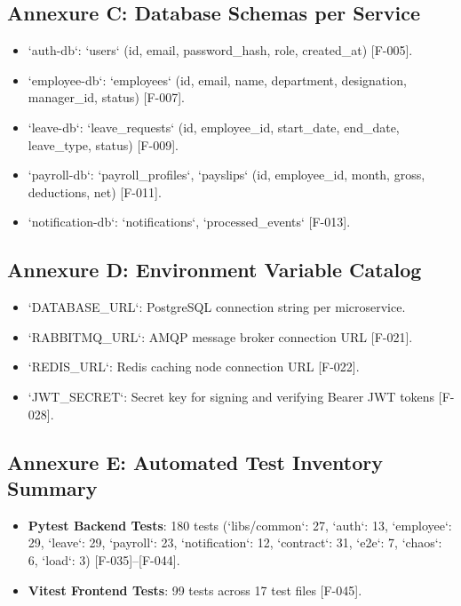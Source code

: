 \documentclass[11pt,a4paper]{article}
\begin{document}
\subsection{Annexure C: Database Schemas per Service}
\begin{itemize}
    \item `auth-db`: `users` (id, email, password\_hash, role, created\_at) [F-005].
    \item `employee-db`: `employees` (id, email, name, department, designation, manager\_id, status) [F-007].
    \item `leave-db`: `leave\_requests` (id, employee\_id, start\_date, end\_date, leave\_type, status) [F-009].
    \item `payroll-db`: `payroll\_profiles`, `payslips` (id, employee\_id, month, gross, deductions, net) [F-011].
    \item `notification-db`: `notifications`, `processed\_events` [F-013].
\end{itemize}

\subsection{Annexure D: Environment Variable Catalog}
\begin{itemize}
    \item `DATABASE\_URL`: PostgreSQL connection string per microservice.
    \item `RABBITMQ\_URL`: AMQP message broker connection URL [F-021].
    \item `REDIS\_URL`: Redis caching node connection URL [F-022].
    \item `JWT\_SECRET`: Secret key for signing and verifying Bearer JWT tokens [F-028].
\end{itemize}

\subsection{Annexure E: Automated Test Inventory Summary}
\begin{itemize}
    \item \textbf{Pytest Backend Tests}: 180 tests (`libs/common`: 27, `auth`: 13, `employee`: 29, `leave`: 29, `payroll`: 23, `notification`: 12, `contract`: 31, `e2e`: 7, `chaos`: 6, `load`: 3) [F-035]--[F-044].
    \item \textbf{Vitest Frontend Tests}: 99 tests across 17 test files [F-045].
\end{itemize}
\end{document}
